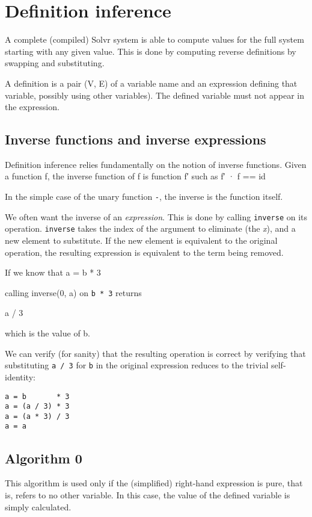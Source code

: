 \documentclass[11pt]{article}
\begin{document}
\section{Definition inference}
\label{sec:org6d87edf}

A complete (compiled) Solvr system is able to compute values for the
full system starting with any given value.  This is done by computing
reverse definitions by swapping and substituting.

A definition is a pair (V, E) of a variable name and an expression
defining that variable, possibly using other variables). The defined
variable must not appear in the expression.
\subsection{Inverse functions and inverse expressions}
\label{sec:orga49eee1}

Definition inference relies fundamentally on the notion of inverse
functions.  Given a function f, the inverse function of f is function
f′ such as f′ · f == id

In the simple case of the unary function \texttt{-}, the inverse is the
function itself.

We often want the inverse of an \emph{expression}.  This is done by calling
\texttt{inverse} on its operation.  \texttt{inverse} takes the index of the argument
to eliminate (the \emph{x}), and a new element to substitute.  If the new
element is equivalent to the original operation, the resulting
expression is equivalent to the term being removed.

If we know that
a = b * 3

calling inverse(0, a) on \texttt{b * 3} returns

a / 3

which is the value of b.

We can verify (for sanity) that the resulting operation is correct by
verifying that substituting \texttt{a / 3} for \texttt{b} in the original expression
reduces to the trivial self-identity:

\begin{verbatim}
a = b       * 3
a = (a / 3) * 3
a = (a * 3) / 3
a = a
\end{verbatim}
\subsection{Algorithm 0}
\label{sec:org140ff4f}

This algorithm is used only if the (simplified) right-hand expression
is pure, that is, refers to no other variable.  In this case, the
value of the defined variable is simply calculated.
\end{document}
